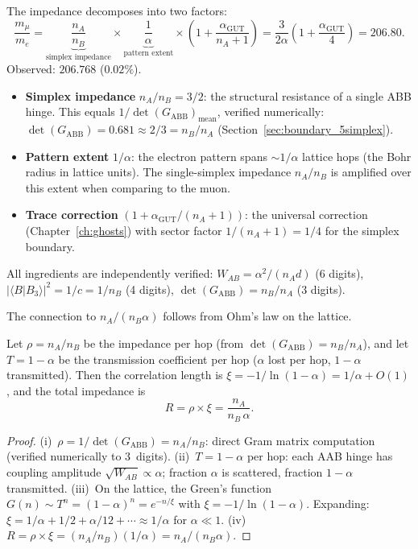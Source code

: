The impedance decomposes into two factors:
\begin{equation}
\label{eq:mu_e}
\boxed{\frac{m_\mu}{m_e} = \underbrace{\frac{n_A}{n_B}}_{\text{simplex impedance}} \times \underbrace{\frac{1}{\alpha}}_{\text{pattern extent}} \times \left(1 + \frac{\alpha_\mathrm{GUT}}{n_A + 1}\right) = \frac{3}{2\alpha}\left(1 + \frac{\alpha_\mathrm{GUT}}{4}\right) = 206.80.}
\end{equation}
Observed: $206.768$ ($0.02\%$).

\begin{itemize}
\item \textbf{Simplex impedance} $n_A/n_B = 3/2$: the structural resistance of a single ABB hinge.  This equals $1/\det(G_\mathrm{ABB})_\mathrm{mean}$, verified numerically: $\det(G_\mathrm{ABB}) = 0.681 \approx 2/3 = n_B/n_A$ (Section~\ref{sec:boundary_5simplex}).

\item \textbf{Pattern extent} $1/\alpha$: the electron pattern spans $\sim 1/\alpha$ lattice hops (the Bohr radius in lattice units).  The single-simplex impedance $n_A/n_B$ is amplified over this extent when comparing to the muon.

\item \textbf{Trace correction} $(1 + \alpha_\mathrm{GUT}/(n_A+1))$: the universal correction (Chapter~\ref{ch:ghosts}) with sector factor $1/(n_A+1) = 1/4$ for the simplex boundary.
\end{itemize}

All ingredients are independently verified: $W_{AB} = \alpha^2/(n_A d)$ (6 digits), $|\langle B|B_3\rangle|^2 = 1/c = 1/n_B$ (4 digits), $\det(G_\mathrm{ABB}) = n_B/n_A$ (3 digits).

The connection to $n_A/(n_B\alpha)$ follows from Ohm's law on the lattice.

\begin{theorem}
\label{thm:lepton_mass}
Let $\rho = n_A/n_B$ be the impedance per hop (from $\det(G_\mathrm{ABB}) = n_B/n_A$), and let $T = 1 - \alpha$ be the transmission coefficient per hop ($\alpha$ lost per hop, $1-\alpha$ transmitted).  Then the correlation length is $\xi = -1/\ln(1-\alpha) = 1/\alpha + O(1)$, and the total impedance is
\begin{equation}
R = \rho \times \xi = \frac{n_A}{n_B\,\alpha}.
\end{equation}
\end{theorem}

\begin{proof}
(i)~$\rho = 1/\det(G_\mathrm{ABB}) = n_A/n_B$: direct Gram matrix computation (verified numerically to 3~digits). (ii)~$T = 1 - \alpha$ per hop: each AAB hinge has coupling amplitude $\sqrt{W_{AB}} \propto \alpha$; fraction $\alpha$ is scattered, fraction $1-\alpha$ transmitted. (iii)~On the lattice, the Green's function $G(n) \sim T^n = (1-\alpha)^n = e^{-n/\xi}$ with $\xi = -1/\ln(1-\alpha)$.  Expanding: $\xi = 1/\alpha + 1/2 + \alpha/12 + \cdots \approx 1/\alpha$ for $\alpha \ll 1$. (iv)~$R = \rho \times \xi = (n_A/n_B)(1/\alpha) = n_A/(n_B\alpha)$.
\end{proof}

